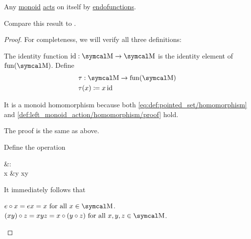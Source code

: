 \begin{proposition}\label{thm:monoid_is_action}
  Any \hyperref[def:unital_magma/associative]{monoid} \hyperref[def:left_monoid_action]{acts} on itself by \hyperref[def:endofunction]{endofunctions}.

  Compare this result to .
\end{proposition}
\begin{proof}
  For completeness, we will verify all three definitions:

   The identity function \( \Id: \CM \to \CM \) is the identity element of \( \Fun(\CM) \). Define
  \begin{align*}
    &\tau: \CM \to \Fun(\CM) \\
    &\tau(x) \coloneqq x \Id
  \end{align*}

  It is a monoid homomorphism because both \eqref{eq:def:pointed_set/homomorphism} and \eqref{def:left_monoid_action/homomorphism/proof} hold.

   The proof is the same as above.

   Define the operation
  \begin{BreakableAlign*}
    {}&\odot{}: \CM \times \CM \to \CM \\
    x &\odot y \coloneqq xy
  \end{BreakableAlign*}

  It immediately follows that
  \begin{RefList}
     \( e \circ x = ex = x \Tforall x \in \CM \).
     \( (x y) \circ z = xyz = x \circ (y \circ z) \Tforall x, y, z \in \CM \).
  \end{RefList}
\end{proof}
